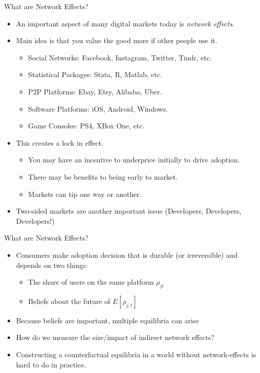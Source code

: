 \documentclass[xcolor=pdftex,dvipsnames,table,mathserif,aspectratio=169]{beamer}
\begin{document}
\begin{frame}{What are Network Effects?}
\begin{itemize}
\item An important aspect of many digital markets today is \textit{network effects}.
\item Main idea is that you value the good more if other people use it.
\begin{itemize}
\item Social Networks: Facebook, Instagram, Twitter, Tindr, etc.
\item Statistical Packages: Stata, R, Matlab, etc.
\item P2P Platforms: Ebay, Etsy, Alibaba, Uber.
\item Software Platforms: iOS, Android, Windows.
\item Game Consoles: PS4, XBox One, etc.
\end{itemize}
\item This creates a \alert{lock in} effect.
\begin{itemize}
\item You may have an incentive to underprice initially to drive adoption.
\item There may be benefits to being early to market.
\item Markets can \alert{tip} one way or another.
\end{itemize}
\item Two-sided markets are another important issue (Developers, Developers, Developers!) 
\end{itemize}
\end{frame}


\begin{frame}{What are Network Effects?}
\begin{itemize}
\item Consumers make adoption decision that is durable (or irreversible) and depends on two things:
\begin{itemize}
\item The share of users on the same platform $\rho_{jt}$
\item Beliefs about the future of $E[\rho_{j,t}]$
\end{itemize}
\item Because beliefs are important, multiple equilibria can arise
\item How do we measure the size/impact of indirect network effects?
\item Constructing a counterfactual equilibria in a world without network-effects is hard to do in practice.
\end{itemize}
\end{frame}
\end{document}
